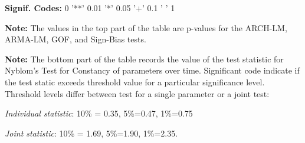 \documentclass[12pt]{article}
\begin{document}
\begin{table}
\begin{tablenotes}
		\item{\footnotesize \textbf{Signif. Codes:} 0 '**' 0.01 '*' 0.05 '+' 0.1 ' ' 1}
		\item{\footnotesize \textbf{Note:} The values in the top part of the table are p-values for the ARCH-LM, ARMA-LM, GOF, and Sign-Bias tests.}
		\item{\footnotesize \textbf{Note:} The bottom part of the table records the value of the test statistic for Nyblom's Test for Constancy of parameters over time. Significant code indicate if the test static exceeds threshold value for a particular significance level. Threshold levels differ between test for a single parameter or a joint test:}
		\item{\footnotesize \textit{Individual statistic}: 10\% = 0.35, 5\%=0.47, 1\%=0.75}
		\item{\footnotesize \textit{     Joint statistic}: 10\% = 1.69, 5\%=1.90, 1\%=2.35.}
	\end{tablenotes}
	\label{tbl:margin_model_diagnostic_pvalues}
\end{table}
\end{document}
